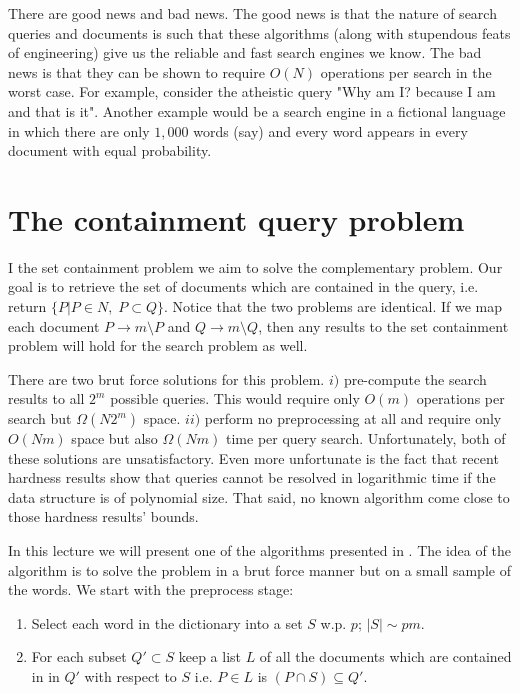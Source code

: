 \documentclass{article}
\begin{document}
There are good news and bad news. The good news is that the nature of search queries and documents is such
that these algorithms (along with stupendous feats of engineering) give us the reliable and fast search engines we know.
The bad news is that they can be shown to require $O(N)$ operations per search in the worst case.
For example, consider the atheistic query "Why am I? because I am and that is it". Another example would
be a search engine in a fictional language in which there are only $1,000$ words (say) and every word appears
in every document with equal probability. 


\section{The containment query problem}
I the set containment problem we aim to solve the complementary problem. Our goal is to retrieve
the set of documents which are contained in the query, i.e. return $\{P | P \in N , \; P \subset Q\}$.
Notice that the two problems are identical. If we map each document $P \rightarrow m \setminus P$ and
$Q \rightarrow m \setminus Q$, then any results to the set containment problem will hold for the search problem as well.

There are two brut force solutions for this problem. 
$i)$ pre-compute the search results to all $2^m$ possible queries.
This would require only $O(m)$ operations per search but $\Omega(N2^m)$ space.
$ii)$ perform no preprocessing at all and require only $O(Nm)$ space but also $\Omega(Nm)$ time per query search.
Unfortunately, both of these solutions are unsatisfactory. Even more unfortunate is the fact that recent 
hardness results show that queries cannot be resolved in logarithmic time if the data structure is of polynomial size.
That said, no known algorithm come close to those hardness results' bounds.



In this lecture we will present one of the algorithms presented in \cite{CIP02}.
The idea of the algorithm is to solve the problem in a brut force manner but on a small sample of the words.
We start with the  preprocess stage: 
\begin{enumerate}
\item Select each word in the dictionary into a set $S$ w.p. $p$; $|S| \sim pm$.
\item For each subset $Q' \subset S$ keep a list $L$ of all the documents which are contained in
in $Q'$ with respect to $S$ i.e. $P \in L$ is $(P \cap S) \subseteq Q'$. 
\end{enumerate}
\end{document}
